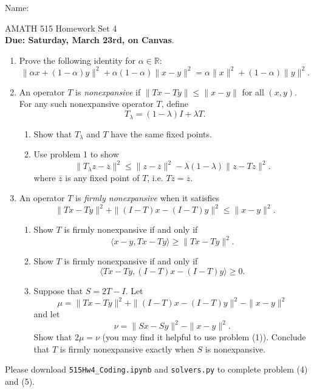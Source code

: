 \documentclass[11pt]{amsart}
\begin{document}
{\Large Name:}  \\
\begin{center}
\Large AMATH 515 \hskip 2in Homework Set 4\\
{\bf Due: Saturday, March 23rd, on Canvas}. 
\end{center}
\bigskip
\begin{enumerate}

\item  Prove the following identity for $\alpha \in \mathbb{R}$:
\[
\|\alpha x + (1-\alpha) y\|^2 + \alpha(1-\alpha) \|x-y\|^2 = \alpha \|x\|^2 + (1-\alpha) \|y\|^2.
\]
\bigskip\bigskip\bigskip



\item An operator $T$ is {\it nonexpansive} if  $\|Tx - Ty\| \leq \|x - y\|$ for all $(x,y)$. 
For any such nonexpansive operator $T$, define 
\[
T_\lambda = (1-\lambda)I + \lambda T. 
\]
\begin{enumerate}
\item Show that $T_\lambda$ and $T$ have the same fixed points. 
\item Use problem 1 to show 
\[
\|T_\lambda z - \overline z\|^2 \leq \|z-\overline z\|^2 - \lambda(1-\lambda) \|z - Tz\|^2.
\]
where $\overline z$ is any fixed point of $T$, i.e. $T\overline z = \overline z$.

\end{enumerate}

\bigskip\bigskip\bigskip

\item An operator $T$ is {\it firmly nonexpansive} when it satisfies 
\[
\|Tx - Ty\|^2 + \|(I-T) x - (I-T)y\|^2 \leq \|x-y\|^2. 
\]


\begin{enumerate}
\item Show $T$ is firmly nonexpansive if and only if 
\[
\langle x-y, Tx - Ty \rangle \geq \|Tx - Ty\|^2. 
\]
\item Show $T$ is firmly nonexpansive if and only if 
\[
\langle Tx - Ty, (I-T)x - (I-T)y \rangle \geq 0. 
\]


\item Suppose that $S = 2T - I$. Let 
\[
\mu = \|Tx - Ty\|^2 + \|(I-T)x - (I-T)y\|^2 - \|x-y\|^2
\]
and let 
\[
\nu = \|Sx - Sy\|^2 - \|x-y\|^2.
\]
Show that $2\mu = \nu$ (you may find it helpful to use problem (1)). Conclude that 
$T$ is firmly nonexpansive exactly when $S$ is nonexpansive. 

\end{enumerate}

\end{enumerate}
\newpage
{}
\vskip 8pt \noindent
Please download \texttt{515Hw4\_Coding.ipynb} and \texttt{solvers.py} to complete problem (4) and (5).
\vskip 8pt
\end{document}

